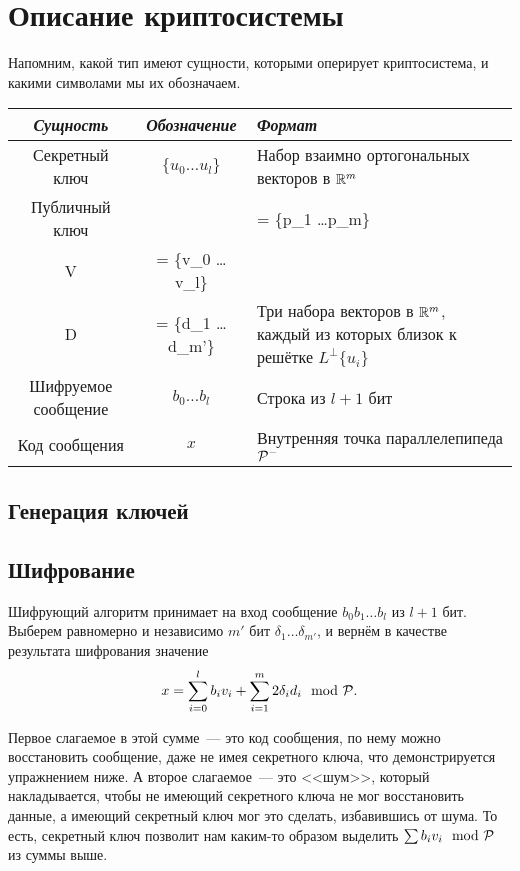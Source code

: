 \documentclass[oneside, a4paper]{article}
\theoremstyle{plain}
\theoremstyle{defn}
\theoremstyle{remark}
\newcommand\PP{\ensuremath \mathcal P}
\newcommand\R{\ensuremath \mathbb R}
\begin{document}
\section{Описание криптосистемы}

Напомним, какой тип имеют сущности, которыми оперирует криптосистема, и какими
символами мы их обозначаем.

\begin{table}[H]
\centering
\begin{tabular}{c | c | m{7cm}}
\emph{Сущность} & \emph{Обозначение} & \emph{Формат} \\
\hline
\hline
Секретный ключ & $\{u_0 \dots u_l\}$ & Набор взаимно ортогональных векторов в $\R^m$ \\
\hline
Публичный ключ
&
\parbox{3cm}{
\[
\begin{aligned}
\PP &= \{p_1 \dots p_m\} \\
V &= \{v_0 \dots v_l\} \\
D &= \{d_1 \dots d_{m'}\}
\end{aligned}
\]
}
& Три набора векторов в $\R^m$, каждый из которых близок к решётке $L^\bot
\{u_i\}$ \\
\hline
Шифруемое сообщение & $b_0 \dots b_l$ & Строка из $l+1$ бит \\
\hline
Код сообщения & $x$ & Внутренняя точка параллелепипеда $\PP^-$ \\
\end{tabular}
\end{table}

\subsection{Генерация ключей}

\subsection{Шифрование} Шифрующий алгоритм принимает на вход сообщение $b_0 b_1 \dots
b_l$ из $l+1$ бит. Выберем равномерно и независимо $m'$ бит $\delta_1 \dots
\delta_{m'}$, и вернём в качестве результата шифрования значение
\[
x = \sum_{i = 0}^l b_i v_i + \sum_{i = 1}^m 2 \delta_i d_i \mod \PP.
\]

Первое слагаемое в этой сумме~--- это код сообщения, по нему можно восстановить
сообщение, даже не имея секретного ключа, что демонстрируется упражнением ниже.
А второе слагаемое~--- это <<шум>>, который накладывается, чтобы не
имеющий секретного ключа не мог восстановить данные, а имеющий секретный
ключ мог это сделать, избавившись от шума. То есть, секретный ключ позволит нам
каким-то образом выделить $\sum b_i v_i \mod \PP$ из суммы выше.
\end{document}
